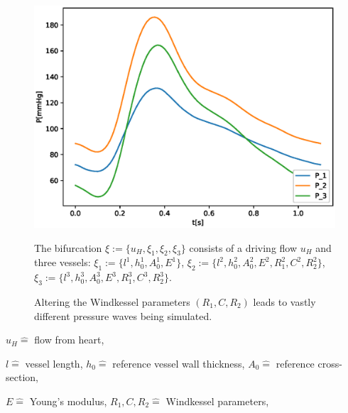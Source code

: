 \documentclass{beamer}
\begin{document}
\begin{frame}
\begin{figure}
\begin{center}
\begin{minipage}{0.43\linewidth}
		\includegraphics[width=\linewidth]{images/compare_output_params_P_P.eps}
		\end{minipage}
		\begin{minipage}{0.43\linewidth}
			\caption*{The bifurcation $\xi := \{u_H, \xi_1, \xi_2, \xi_3\}$ consists of a driving flow $u_H$ and three vessels: $\xi_1 := \{l^1, h_0^1, A_0^1, E^1\}$, $\xi_2 := \{l^2, h_0^2, A_0^2, E^2, R_1^2, C^2, R_2^2\}$, $\xi_3 := \{l^3, h_0^3, A_0^3, E^3, R_1^3, C^3, R_2^3\}.$}
		\end{minipage}
		\hfill
		\begin{minipage}{0.43\linewidth}
			\caption*{Altering the Windkessel parameters $(R_1,C,R_2)$ leads to vastly different pressure waves being simulated.}
			\vfill
		\end{minipage}
	\end{center}
	\end{figure}
	{\tiny \centering 
		$u_H \hat{=}$ flow from heart,

		$l \hat{=}$ vessel length,
		$h_0 \hat{=}$ reference vessel wall thickness,
		$A_0 \hat{=}$ reference cross-section,

		$E \hat{=}$ Young's modulus,
		$R_1, C, R_2 \hat{=}$ Windkessel parameters,
	\par}
\end{frame}
\end{document}
